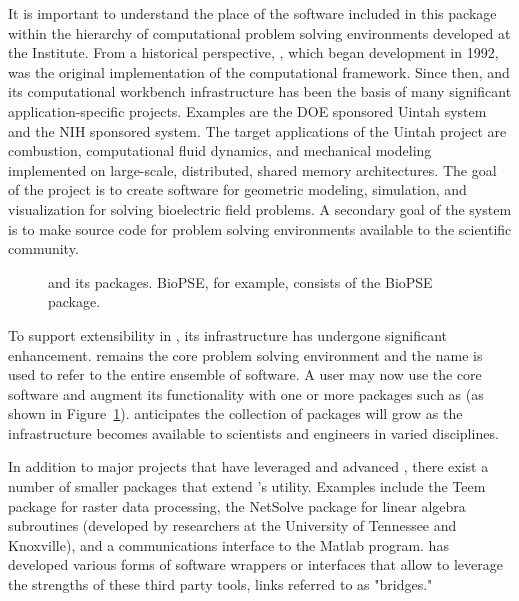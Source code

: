 It is important to understand the place of the software included in
this package within the hierarchy of computational problem solving
environments developed at the \sci{} Institute.  From a historical
perspective, \SR{}, which began development in 1992, was the
original implementation of the computational
framework\cite{CRJ:Joh94c,RSM:Par95,RSM:Par95b,RSM:Par97,RSM:Par97b,CRJ:Parker99b}.
Since then, \SR{} and its computational workbench infrastructure has
been the basis of many significant application-specific projects. 
Examples are the DOE sponsored Uintah system \cite{RSM:Dav2000}
and the NIH sponsored \BIOPSE{} system.  The target applications of
the Uintah project are combustion, computational fluid dynamics, and
mechanical modeling implemented on large-scale, distributed, shared
memory architectures.  The goal of the \BIOPSE{} project is to create
software for geometric modeling, simulation, and visualization for
solving bioelectric field problems.  A secondary goal of
the \SR{} system is to make source code for  problem solving
environments available to the scientific community.

\begin{figure}[htb]
  \centering
  \begin{makeimage} \end{makeimage}
  \eabfig
  \caption{\label{fig:SCIRunSoftSys} \sr{} and its
    packages.  BioPSE, for example, consists of \sr{}
    the BioPSE package.}
\end{figure}

To support extensibility in \sr{}, its infrastructure has undergone
significant enhancement. \SR{} remains the core problem solving
environment and the name is used to refer to the entire ensemble of
software.  A user may now use the core \SR{} software and augment its
functionality with one or more packages such as \BIOPSE{} (as shown in
Figure~\ref{fig:SCIRunSoftSys}).  \sci{} anticipates the collection of
packages will grow as the \SR{} infrastructure becomes available to
scientists and engineers in varied disciplines.

In addition to major projects that have leveraged and
advanced \SR{}, there exist a number of smaller packages that extend
\SR{}'s utility.  Examples include the Teem package for raster data
processing, the NetSolve package for linear algebra subroutines
(developed by researchers at the University of Tennessee and
Knoxville), and a communications interface to the Matlab program.  \SCI{}
has developed various forms of software wrappers or interfaces that
allow \SR{} to leverage the strengths of these third party tools,
links referred to as "bridges."

